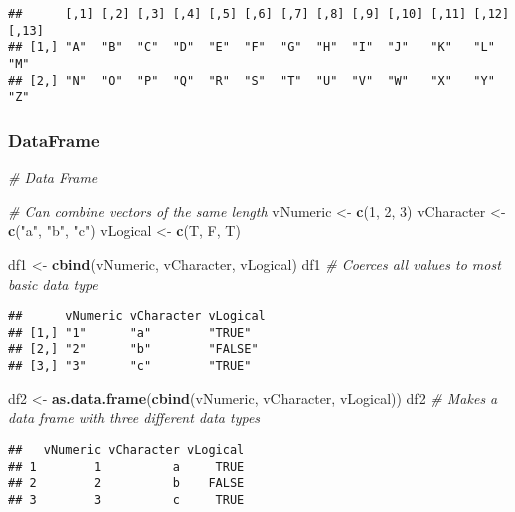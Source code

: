 \documentclass[
]{article}
\newenvironment{Shaded}{\begin{snugshade}}{\end{snugshade}}
\newcommand{\CommentTok}[1]{\textcolor[rgb]{0.56,0.35,0.01}{\textit{#1}}}
\newcommand{\DecValTok}[1]{\textcolor[rgb]{0.00,0.00,0.81}{#1}}
\newcommand{\FunctionTok}[1]{\textcolor[rgb]{0.13,0.29,0.53}{\textbf{#1}}}
\newcommand{\NormalTok}[1]{#1}
\newcommand{\OtherTok}[1]{\textcolor[rgb]{0.56,0.35,0.01}{#1}}
\newcommand{\StringTok}[1]{\textcolor[rgb]{0.31,0.60,0.02}{#1}}
\begin{document}
\begin{verbatim}
##      [,1] [,2] [,3] [,4] [,5] [,6] [,7] [,8] [,9] [,10] [,11] [,12] [,13]
## [1,] "A"  "B"  "C"  "D"  "E"  "F"  "G"  "H"  "I"  "J"   "K"   "L"   "M"  
## [2,] "N"  "O"  "P"  "Q"  "R"  "S"  "T"  "U"  "V"  "W"   "X"   "Y"   "Z"
\end{verbatim}

\subsubsection{DataFrame}\label{dataframe}

\begin{Shaded}
\begin{Highlighting}[]
\CommentTok{\# Data Frame}

\CommentTok{\# Can combine vectors of the same length}
\NormalTok{vNumeric   }\OtherTok{\textless{}{-}} \FunctionTok{c}\NormalTok{(}\DecValTok{1}\NormalTok{, }\DecValTok{2}\NormalTok{, }\DecValTok{3}\NormalTok{)}
\NormalTok{vCharacter }\OtherTok{\textless{}{-}} \FunctionTok{c}\NormalTok{(}\StringTok{"a"}\NormalTok{, }\StringTok{"b"}\NormalTok{, }\StringTok{"c"}\NormalTok{)}
\NormalTok{vLogical   }\OtherTok{\textless{}{-}} \FunctionTok{c}\NormalTok{(T, F, T)}

\NormalTok{df1 }\OtherTok{\textless{}{-}} \FunctionTok{cbind}\NormalTok{(vNumeric, vCharacter, vLogical)}
\NormalTok{df1  }\CommentTok{\# Coerces all values to most basic data type}
\end{Highlighting}
\end{Shaded}

\begin{verbatim}
##      vNumeric vCharacter vLogical
## [1,] "1"      "a"        "TRUE"  
## [2,] "2"      "b"        "FALSE" 
## [3,] "3"      "c"        "TRUE"
\end{verbatim}

\begin{Shaded}
\begin{Highlighting}[]
\NormalTok{df2 }\OtherTok{\textless{}{-}} \FunctionTok{as.data.frame}\NormalTok{(}\FunctionTok{cbind}\NormalTok{(vNumeric, vCharacter, vLogical))}
\NormalTok{df2  }\CommentTok{\# Makes a data frame with three different data types}
\end{Highlighting}
\end{Shaded}

\begin{verbatim}
##   vNumeric vCharacter vLogical
## 1        1          a     TRUE
## 2        2          b    FALSE
## 3        3          c     TRUE
\end{verbatim}
\end{document}
